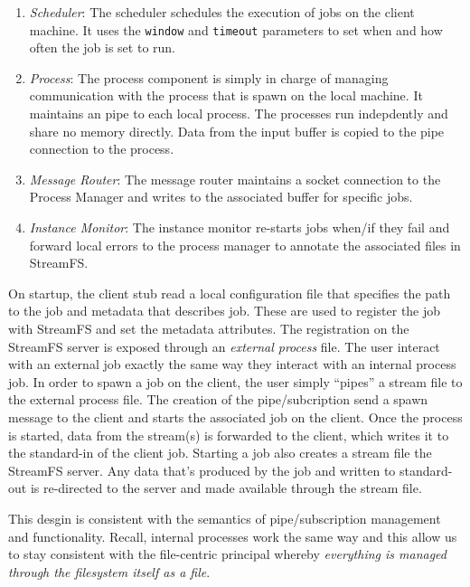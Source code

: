 \begin{enumerate}
\item \emph{Scheduler}: The scheduler schedules the execution of jobs on the client machine.  It uses the \texttt{window} and
						\texttt{timeout} parameters to set when and how often the job is set to run.
\item \emph{Process}:  The process component is simply in charge of managing communication with the process that is spawn
						on the local machine.  It maintains an pipe to each local process.  The processes
						run indepdently and share no memory directly.  Data from the input buffer is copied to the 
						pipe connection to the process.
\item \emph{Message Router}: The message router maintains a socket connection to the Process Manager and writes to the associated
								buffer for specific jobs.
\item \emph{Instance Monitor}: The instance monitor re-starts jobs when/if they fail and forward local errors to the process manager
								to annotate the associated files in StreamFS.
\end{enumerate}

On startup, the client stub read a local configuration file that specifies the path to the job and metadata that describes
job.  These are used to register the job with StreamFS and set the metadata attributes.  The registration on the StreamFS 
server is exposed through an \emph{external process} file.  The user interact with an external job exactly the same way they
interact with an internal process job.  In order to spawn a job on the client, the user simply ``pipes'' a stream file 
to the external process file.  The creation of the pipe/subcription send a spawn message to the client and starts the associated
job on the client.  Once the process is started, data from the stream(s) is forwarded to the client, which writes it to the 
standard-in of the client job.  Starting a job also creates a stream file the StreamFS server.  Any data that's produced by the job
and written to standard-out is re-directed to the server and made available through the stream file.

This desgin is consistent with the semantics of pipe/subscription management and functionality.  Recall, internal processes
work the same way and this allow us to stay consistent with the file-centric principal whereby \emph{everything is managed
through the filesystem itself as a file}.


